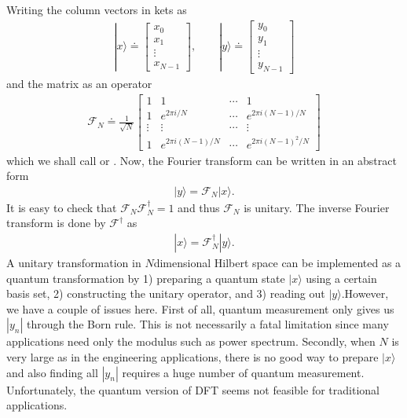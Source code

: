 \documentclass[letterpaper,10pt,english]{jupyterBook}
\begin{document}
\sphinxAtStartPar
Writing the column vectors in kets as
\begin{equation*}
\begin{split}
|x\rangle \doteq \begin{bmatrix}x_0\\x_1\\ \vdots \\ x_{N-1}\end{bmatrix}, \qquad
|y\rangle \doteq \begin{bmatrix}y_0\\y_1\\ \vdots \\ y_{N-1}\end{bmatrix}
\end{split}
\end{equation*}
\sphinxAtStartPar
and the matrix as an operator
\begin{equation*}
\begin{split}
\mathcal{F}_N \doteq \frac{1}{\sqrt{N}} \begin{bmatrix} 1 & 1 & \cdots & 1 \\ 1 & e^{2\pi i/N} & \cdots & e^{2\pi i (N-1)/N} \\
\vdots & \vdots & \cdots &\vdots \\ 1 & e^{2\pi i (N-1)/N} &\cdots & e^{2\pi i (N-1)^2/N}
\end{bmatrix}
\end{split}
\end{equation*}
\sphinxAtStartPar
which we shall call  or . Now, the Fourier transform can be written in an abstract form
\begin{equation}\label{equation:algorithms/qft:DFT-as-operator}
\begin{split}
|y\rangle = \mathcal{F}_N |x\rangle .
\end{split}
\end{equation}
\sphinxAtStartPar
It is easy to check that \(\mathcal{F}_N \mathcal{F}_N^\dagger = 1\) and thus \(\mathcal{F}_N\) is unitary. The inverse Fourier transform is done by \(\mathcal{F}^\dagger\) as
\begin{equation}\label{equation:algorithms/qft:DFT-inverse}
\begin{split}
|x\rangle = \mathcal{F}_N^\dagger |y\rangle .
\end{split}
\end{equation}
\sphinxAtStartPar
A unitary transformation in \(N\)\sphinxhyphen{}dimensional Hilbert space can be implemented as a quantum transformation by 1) preparing a quantum state \(|x\rangle\) using a certain basis set, 2) constructing the unitary operator, and 3) reading out \(|y\rangle\).However, we have a couple of issues here.  First of all,  quantum measurement only gives us \(|y_n|\) through the Born rule.  This is not necessarily a fatal limitation since many applications need only the modulus such as power spectrum. Secondly, when \(N\) is very large as in the engineering applications, there is no good way to prepare \(|x\rangle\)  and also finding all \(|y_n|\) requires a huge number of quantum measurement.   Unfortunately, the quantum version of DFT seems not feasible for traditional applications.
\end{document}
